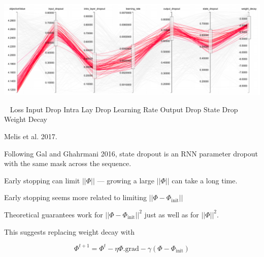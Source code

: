 {\centerline{\includegraphics[width = 7in]{../images/HyperSearch}}
\centerline{\large ~ \hspace{3em} Loss \hspace{2em} Input Drop \hspace{1em} Intra Lay Drop \hspace{1em} Learning Rate \hspace{1em} Output Drop \hspace{1em}  State Drop \hspace{1em} Weight Decay}

\centerline{Melis et al. 2017.}

Following Gal and Ghahrmani 2016, state dropout is an RNN parameter dropout with the same mask across the sequence.


Early stopping can limit $||\Phi||$ --- growing a large $||\Phi||$ can take a long time.

\vfill
Early stopping seems more related to limiting $||\Phi - \Phi_\mathrm{init}||$
\vfill

Theoretical guarantees work for $||\Phi - \Phi_{\mathrm{init}}||^2$ just as well as for $||\Phi||^2$.

\vfill
This suggests replacing weight decay with

\vfill
$$\Phi^{t+1} = \Phi^t - \eta \Phi.\mathrm{grad} - \gamma(\Phi - \Phi_\mathrm{init})$$

}
